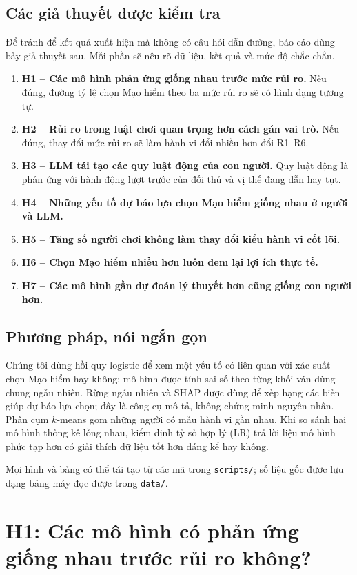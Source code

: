 \documentclass[11pt]{article}
\begin{document}
\subsection{Các giả thuyết được kiểm tra}
Để tránh để kết quả xuất hiện mà không có câu hỏi dẫn đường, báo cáo dùng bảy
giả thuyết sau. Mỗi phần sẽ nêu rõ dữ liệu, kết quả và mức độ chắc chắn.
\begin{enumerate}[leftmargin=*]
\item \textbf{H1 -- Các mô hình phản ứng giống nhau trước mức rủi ro.} Nếu đúng,
đường tỷ lệ chọn Mạo hiểm theo ba mức rủi ro sẽ có hình dạng tương tự.
\item \textbf{H2 -- Rủi ro trong luật chơi quan trọng hơn cách gán vai trò.} Nếu
đúng, thay đổi mức rủi ro sẽ làm hành vi đổi nhiều hơn đổi R1--R6.
\item \textbf{H3 -- LLM tái tạo các quy luật động của con người.} Quy luật động
là phản ứng với hành động lượt trước của đối thủ và vị thế đang dẫn hay tụt.
\item \textbf{H4 -- Những yếu tố dự báo lựa chọn Mạo hiểm giống nhau ở người và
LLM.}
\item \textbf{H5 -- Tăng số người chơi không làm thay đổi kiểu hành vi cốt lõi.}
\item \textbf{H6 -- Chọn Mạo hiểm nhiều hơn luôn đem lại lợi ích thực tế.}
\item \textbf{H7 -- Các mô hình gần dự đoán lý thuyết hơn cũng giống con người
hơn.}
\end{enumerate}

\subsection{Phương pháp, nói ngắn gọn}
Chúng tôi dùng hồi quy logistic để xem một yếu tố có liên quan với xác suất
chọn Mạo hiểm hay không; mô hình được tính sai số theo từng khối ván dùng chung
ngẫu nhiên. Rừng ngẫu nhiên và SHAP được dùng để xếp hạng các biến giúp dự báo
lựa chọn; đây là công cụ mô tả, không chứng minh nguyên nhân. Phân cụm $k$-means
gom những người có mẫu hành vi gần nhau. Khi so sánh hai mô hình thống kê lồng
nhau, kiểm định tỷ số hợp lý (LR) trả lời liệu mô hình phức tạp hơn có giải
thích dữ liệu tốt hơn đáng kể hay không.

Mọi hình và bảng có thể tái tạo từ các mã trong \texttt{scripts/};
số liệu gốc được lưu dạng bảng máy đọc được trong \texttt{data/}.

\clearpage
\section{H1: Các mô hình có phản ứng giống nhau trước rủi ro không?}
\label{sec:heterogeneity}
\end{document}
